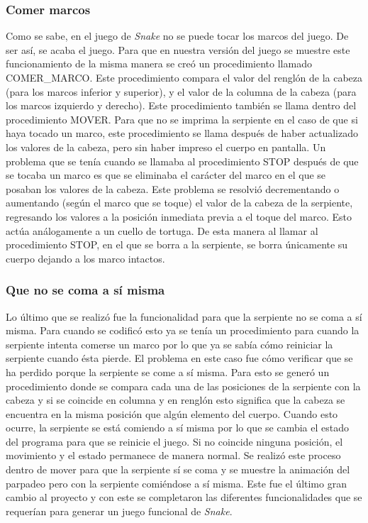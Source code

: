 \documentclass[12pt]{article}
\begin{document}
\subsubsection*{Comer marcos}
Como se sabe, en el juego de \textit{Snake} no se puede tocar los marcos del juego. De ser así, se acaba el juego. Para que en nuestra versión del juego se muestre este funcionamiento de la misma manera se creó un procedimiento llamado COMER\_MARCO. Este procedimiento compara el valor del renglón de la cabeza (para los marcos inferior y superior), y el valor de la columna de la cabeza (para los marcos izquierdo y derecho). Este procedimiento también se llama dentro del procedimiento MOVER. Para que no se imprima la serpiente en el caso de que si haya tocado un marco, este procedimiento se llama después de haber actualizado los valores de la cabeza, pero sin haber impreso el cuerpo en pantalla. Un problema que se tenía cuando se llamaba al procedimiento STOP después de que se tocaba un marco es que se eliminaba el carácter del marco en el que se posaban los valores de la cabeza. Este problema se resolvió decrementando o aumentando (según el marco que se toque) el valor de la cabeza de la serpiente, regresando los valores a la posición inmediata previa a el toque del marco. Esto actúa análogamente a un cuello de tortuga. De esta manera al llamar al procedimiento STOP, en el que se borra a la serpiente, se borra únicamente su cuerpo dejando a los marco intactos. 

\subsubsection*{Que no se coma a sí misma}
Lo último que se realizó fue la funcionalidad para que la serpiente no se coma a sí misma. Para cuando se codificó esto ya se tenía un procedimiento para cuando la serpiente intenta comerse un marco por lo que ya se sabía cómo reiniciar la serpiente cuando ésta pierde. El problema en este caso fue cómo verificar que se ha perdido porque la serpiente se come a sí misma. Para esto se generó un procedimiento donde se compara cada una de las posiciones de la serpiente con la cabeza y si se coincide en columna y en renglón esto significa que la cabeza se encuentra en la misma posición que algún elemento del cuerpo. Cuando esto ocurre, la serpiente se está comiendo a sí misma por lo que se cambia el estado del programa para que se reinicie el juego. Si no coincide ninguna posición, el movimiento y el estado permanece de manera normal. Se realizó este proceso dentro de mover para que la serpiente sí se coma y se muestre la animación del parpadeo pero con la serpiente comiéndose a sí misma. Este fue el último gran cambio al proyecto y con este se completaron las diferentes funcionalidades que se requerían para generar un juego funcional de \textit{Snake}.
\end{document}
